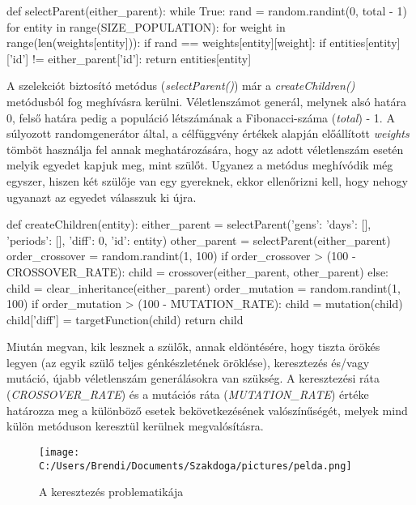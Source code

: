 \documentclass[a4paper,12pt]{article}
\begin{document}
\begin{python}
def selectParent(either_parent):
    while True:
        rand = random.randint(0, total - 1)
        for entity in range(SIZE_POPULATION):
            for weight in range(len(weights[entity])):
                if rand == weights[entity][weight]:
                    if entities[entity]['id'] != either_parent['id']:
                        return entities[entity]
\end{python}

A szelekciót biztosító metódus (\textsl{selectParent()}) már a \textsl{createChildren()} metódusból fog meghívásra kerülni. Véletlenszámot generál, melynek alsó határa 0, felső határa pedig a populáció létszámának a Fibonacci-száma (\textsl{total}) - 1. A súlyozott randomgenerátor által, a célfüggvény értékek alapján előállított \textsl{weights} tömböt használja fel annak meghatározására, hogy az adott véletlenszám esetén melyik egyedet kapjuk meg, mint szülőt. Ugyanez a metódus meghívódik még egyszer, hiszen két szülője van egy gyereknek, ekkor ellenőrizni kell, hogy nehogy ugyanazt az egyedet válasszuk ki újra.

\begin{python}
def createChildren(entity):
    either_parent = selectParent({'gens': {'days': [], 'periods': []}, 'diff': 0, 'id': entity})
    other_parent = selectParent(either_parent)
    order_crossover = random.randint(1, 100)
    if order_crossover > (100 - CROSSOVER_RATE):
        child = crossover(either_parent, other_parent)
    else:
        child = clear_inheritance(either_parent)
    order_mutation = random.randint(1, 100)
    if order_mutation > (100 - MUTATION_RATE):
        child = mutation(child)
    child['diff'] = targetFunction(child)
    return child
\end{python}

Miután megvan, kik lesznek a szülők, annak eldöntésére, hogy tiszta örökés legyen (az egyik szülő teljes génkészletének öröklése), keresztezés és/vagy mutáció, újabb véletlenszám generálásokra van szükség. A keresztezési ráta (\textsl{CROSSOVER_RATE}) és a mutációs ráta (\textsl{MUTATION_RATE}) értéke határozza meg a különböző esetek bekövetkezésének valószínűségét, melyek mind külön metóduson keresztül kerülnek megvalósításra.

\begin{figure}
\texttt{[image: C:/Users/Brendi/Documents/Szakdoga/pictures/pelda.png]}
\caption{A keresztezés problematikája}
\end{figure}
\end{document}
